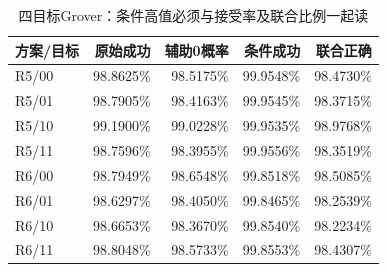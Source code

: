 \begin{table}[htbp]\centering\small
\caption{四目标Grover：条件高值必须与接受率及联合比例一起读}\label{tab:grover}
\begin{tabular}{@{}lrrrr@{}}\toprule
方案/目标 & 原始成功 & 辅助0概率 & 条件成功 & 联合正确\\\midrule
R5/00 & 98.8625\% & 98.5175\% & 99.9548\% & 98.4730\%\\
R5/01 & 98.7905\% & 98.4163\% & 99.9545\% & 98.3715\%\\
R5/10 & 99.1900\% & 99.0228\% & 99.9535\% & 98.9768\%\\
R5/11 & 98.7596\% & 98.3955\% & 99.9556\% & 98.3519\%\\
R6/00 & 98.7949\% & 98.6548\% & 99.8518\% & 98.5085\%\\
R6/01 & 98.6297\% & 98.4050\% & 99.8465\% & 98.2539\%\\
R6/10 & 98.6653\% & 98.3670\% & 99.8540\% & 98.2234\%\\
R6/11 & 98.8048\% & 98.5733\% & 99.8553\% & 98.4307\%\\
\bottomrule\end{tabular}\end{table}
